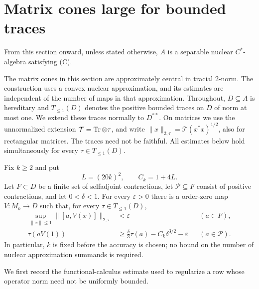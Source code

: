 \section{Matrix cones large for bounded traces}
\label{sec:tracial}

From this section onward, unless stated otherwise, $A$ is a separable
nuclear $C^*$-algebra satisfying \textup{(C)}.

The matrix cones in this section are approximately central in tracial
$2$-norm.  The construction uses a convex nuclear approximation, and its
estimates are independent of the number of maps in that approximation.
Throughout, $D\subseteq A$ is hereditary and $T_{\leq1}(D)$ denotes the
positive bounded traces on $D$ of norm at most one.  We extend these traces
normally to $D^{**}$.  On matrices we use the unnormalized extension
$\mathcal T=\operatorname{Tr}\otimes\tau$, and write
$\|x\|_{2,\tau}=\mathcal T(x^*x)^{1/2}$, also for rectangular matrices.
The traces need not be faithful.  All estimates below hold simultaneously
for every $\tau\in T_{\leq1}(D)$.

\begin{proposition}\label{prop:bounded-trace}
Fix $k\geq2$ and put
\[
 L=(20k)^2,\qquad C_k=1+4L.
\]
Let $F\subset D$ be a finite set of selfadjoint contractions, let
$\mathcal P\subseteq F$ consist of positive contractions, and let
$0<\delta<1$.  For every $\varepsilon>0$ there is a \cpc order-zero map
$V:M_k\to D$ such that, for every $\tau\in T_{\leq1}(D)$,
\begin{align}
 \sup_{\|x\|\leq1}\|[a,V(x)]\|_{2,\tau}
 &<\varepsilon &&(a\in F),\label{tr:central-target}\\
 \tau(aV(1))
 &\geq \frac\delta3\tau(a)-C_k\delta^{3/2}-\varepsilon
 &&(a\in\mathcal P).\label{tr:mass-target}
\end{align}
In particular, $k$ is fixed before the accuracy is chosen; no bound on the
number of nuclear approximation summands is required.
\end{proposition}

We first record the functional-calculus estimate used to regularize a
row whose operator norm need not be uniformly bounded.

